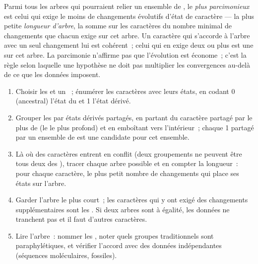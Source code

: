 
\begin{definition}[La parcimonie]\label{def:b1:classifying-biodiversity:parsimony}
Parmi tous les arbres qui pourraient relier un ensemble de , le
\emph{plus parcimonieux} est celui qui exige le moins de changements
évolutifs d'état de caractère --- la plus petite \emph{longueur
d'arbre}, la somme sur les caractères du nombre minimal de changements
que chacun exige sur cet arbre. Un caractère qui s'accorde à l'arbre
avec un seul changement lui est cohérent~; celui qui en exige deux ou
plus est une  sur cet arbre. La parcimonie n'affirme pas que
l'évolution est économe~; c'est la règle selon laquelle une hypothèse ne
doit pas multiplier les convergences au-delà de ce que les données
imposent.
\end{definition}

\begin{method}\label{met:b1:classifying-biodiversity:cladogram}
\begin{enumerate}
  \item Choisir les  et un ~; énumérer les
        caractères avec leurs états, en codant 0 (ancestral) l'état du
         et 1 l'état dérivé.
  \item Grouper les  par états dérivés partagés, en partant du
        caractère partagé par le plus de  (le  le plus
        profond) et en emboîtant vers l'intérieur~; chaque 1 partagé par
        un ensemble de  est une  candidate pour cet
        ensemble.
  \item Là où des caractères entrent en conflit (deux groupements ne
        peuvent être tous deux des ), tracer chaque arbre
        possible et en compter la longueur~: pour chaque caractère, le
        plus petit nombre de changements qui place ses états sur
        l'arbre.
  \item Garder l'arbre le plus court~; les caractères qui y ont exigé
        des changements supplémentaires sont les . Si deux
        arbres sont à égalité, les données ne tranchent pas et il faut
        d'autres caractères.
  \item Lire l'arbre~: nommer les , noter quels groupes
        traditionnels sont paraphylétiques, et vérifier l'accord avec
        des données indépendantes (séquences moléculaires, fossiles).
\end{enumerate}
\end{method}

